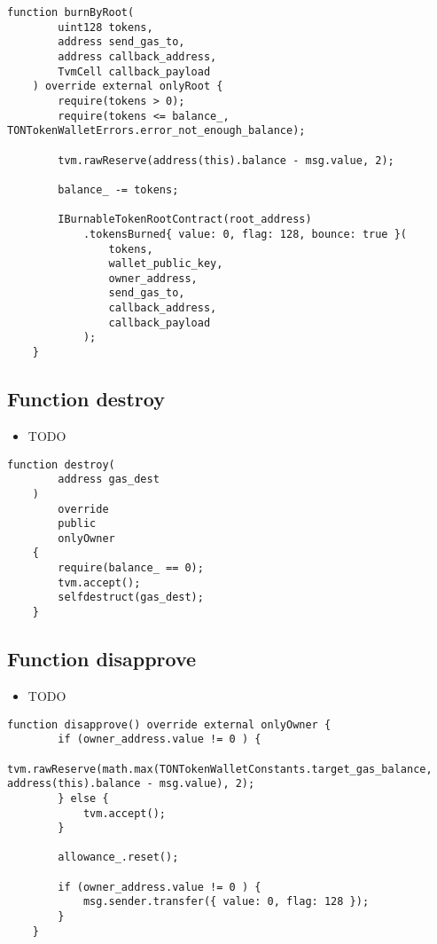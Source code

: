 \begin{lstlisting}[firstnumber=520]
    function burnByRoot(
        uint128 tokens,
        address send_gas_to,
        address callback_address,
        TvmCell callback_payload
    ) override external onlyRoot {
        require(tokens > 0);
        require(tokens <= balance_, TONTokenWalletErrors.error_not_enough_balance);

        tvm.rawReserve(address(this).balance - msg.value, 2);

        balance_ -= tokens;

        IBurnableTokenRootContract(root_address)
            .tokensBurned{ value: 0, flag: 128, bounce: true }(
                tokens,
                wallet_public_key,
                owner_address,
                send_gas_to,
                callback_address,
                callback_payload
            );
    }
\end{lstlisting}

\subsection{Function destroy}

\noindent\begin{itemize}
\item TODO
\end{itemize}

\begin{lstlisting}[firstnumber=584]
    function destroy(
        address gas_dest
    )
        override
        public
        onlyOwner
    {
        require(balance_ == 0);
        tvm.accept();
        selfdestruct(gas_dest);
    }
\end{lstlisting}

\subsection{Function disapprove}

\noindent\begin{itemize}
\item TODO
\end{itemize}

\begin{lstlisting}[firstnumber=148]
    function disapprove() override external onlyOwner {
        if (owner_address.value != 0 ) {
            tvm.rawReserve(math.max(TONTokenWalletConstants.target_gas_balance, address(this).balance - msg.value), 2);
        } else {
            tvm.accept();
        }

        allowance_.reset();

        if (owner_address.value != 0 ) {
            msg.sender.transfer({ value: 0, flag: 128 });
        }
    }
\end{lstlisting}

